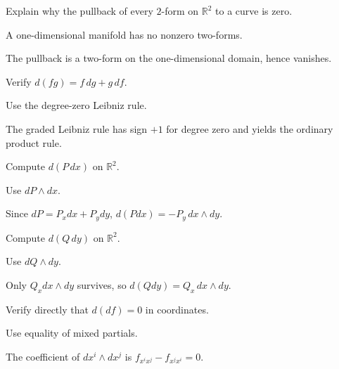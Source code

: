 \begin{exercise}\label{exr:vii09-11}
Explain why the pullback of every \(2\)-form on \(\mathbb R^2\) to a curve is zero.
\end{exercise}
\begin{hint}
A one-dimensional manifold has no nonzero two-forms.
\end{hint}
\begin{solution}
The pullback is a two-form on the one-dimensional domain, hence vanishes.
\end{solution}

\begin{exercise}\label{exr:vii09-12}
Verify \(d(fg)=f\,dg+g\,df\).
\end{exercise}
\begin{hint}
Use the degree-zero Leibniz rule.
\end{hint}
\begin{solution}
The graded Leibniz rule has sign \(+1\) for degree zero and yields the ordinary product rule.
\end{solution}

\begin{exercise}\label{exr:vii09-13}
Compute \(d(P\,dx)\) on \(\mathbb R^2\).
\end{exercise}
\begin{hint}
Use \(dP\wedge dx\).
\end{hint}
\begin{solution}
Since \(dP=P_xdx+P_ydy\), \(d(Pdx)=-P_y\,dx\wedge dy\).
\end{solution}

\begin{exercise}\label{exr:vii09-14}
Compute \(d(Q\,dy)\) on \(\mathbb R^2\).
\end{exercise}
\begin{hint}
Use \(dQ\wedge dy\).
\end{hint}
\begin{solution}
Only \(Q_xdx\wedge dy\) survives, so \(d(Qdy)=Q_x\,dx\wedge dy\).
\end{solution}

\begin{exercise}\label{exr:vii09-15}
Verify directly that \(d(df)=0\) in coordinates.
\end{exercise}
\begin{hint}
Use equality of mixed partials.
\end{hint}
\begin{solution}
The coefficient of \(dx^i\wedge dx^j\) is \(f_{x^ix^j}-f_{x^jx^i}=0\).
\end{solution}


